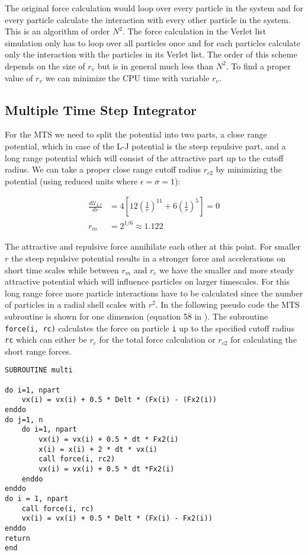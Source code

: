 \documentclass[a4paper]{article}
\begin{document}
The original force calculation would loop over every particle in the system and for every particle
calculate the interaction with every other particle in the system. This is an algorithm of order
$N^2$. The force calculation in the Verlet list simulation only has to loop over all particles once
and for each particles calculate only the interaction with the particles in its Verlet list. The
order of this scheme depends on the size of $r_v$ but is in general much less than $N^2$. To find a
proper value of $r_v$ we can minimize the CPU time with variable $r_v$.

\subsection{Multiple Time Step Integrator}
For the MTS we need to split the potential into two parts, a close range potential, which in case of
the L-J potential is the steep repulsive part, and a long range potential which will consist of the
attractive part up to the cutoff radius. We can take a proper close range cutoff radius $r_{c2}$ by
minimizing the potential (using reduced units where $\epsilon=\sigma=1$):

\begin{align}
    \frac{d\mathcal{U}_{LJ}}{dr} & = 4\left [12\left (\frac{1}{r}\right )^{11} + 6\left (\frac{1}{r}\right )^5\right ] = 0 \\
    r_m & = 2^{1/6} \approx 1.122 \nonumber
\end{align}

The attractive and repulsive force annihilate each other at this point. For smaller $r$ the steep
repulsive potential results in a stronger force and accelerations on short time scales while between
$r_m$ and $r_c$ we have the smaller and more steady attractive potential which will influence
particles on larger timescales. For this long range force more particle interactions have to be
calculated since the number of particles in a radial shell scales with $r^2$. In the following
pseudo code the MTS subroutine is shown for one dimension (equation 58 in \cite{multi}). The
subroutine \texttt{force(i, rc)} calculates the force on particle
\texttt{i} up to the specified cutoff radius \texttt{rc} which can either
be $r_c$ for the total force calculation or $r_{c2}$ for calculating the short range forces.

\begin{verbatim}
SUBROUTINE multi

do i=1, npart
    vx(i) = vx(i) + 0.5 * Delt * (Fx(i) - (Fx2(i))
enddo
do j=1, n
    do i=1, npart
        vx(i) = vx(i) + 0.5 * dt * Fx2(i)
        x(i) = x(i) + 2 * dt * vx(i)
        call force(i, rc2)
        vx(i) = vx(i) + 0.5 * dt *Fx2(i)
    enddo
enddo
do i = 1, npart
    call force(i, rc)
    vx(i) = vx(i) + 0.5 * Delt * (Fx(i) - Fx2(i))
enddo
return
end
\end{verbatim}
\end{document}
